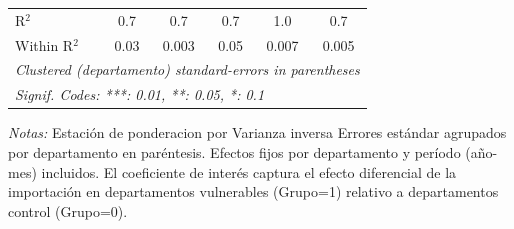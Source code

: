 \documentclass[12pt]{article}
\begin{document}
\begin{table}[htbp]
\begin{threeparttable}
\begin{tabular}{lccccc}
      R$^2$                                             & 0.7            & 0.7            & 0.7            & 1.0            & 0.7\\  
      Within R$^2$                                      & 0.03           & 0.003          & 0.05           & 0.007          & 0.005\\  
      \midrule \midrule
      \multicolumn{6}{l}{\emph{Clustered (departamento) standard-errors in parentheses}}\\
      \multicolumn{6}{l}{\emph{Signif. Codes: ***: 0.01, **: 0.05, *: 0.1}}\\
   \end{tabular}


\begin{tablenotes}
\footnotesize
\item \textit{Notas:} Estación de ponderacion por Varianza inversa
Errores estándar agrupados por departamento en paréntesis.
Efectos fijos por departamento y período (año-mes) incluidos.
El coeficiente de interés captura el efecto diferencial de la importación
en departamentos vulnerables (Grupo=1) relativo a departamentos control (Grupo=0).
\end{tablenotes}
\end{threeparttable}
\end{table}
\end{document}
